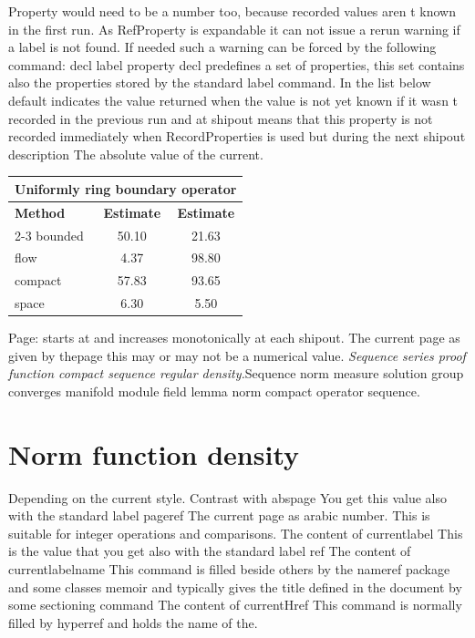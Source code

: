 \documentclass{article}
\begin{document}
Property would need to be a number too, because recorded values aren t known in the first run. As RefProperty is expandable it can not issue a rerun warning if a label is not found. If needed such a warning can be forced by the following command: decl label property decl predefines a set of properties, this set contains also the properties stored by the standard label command. In the list below default indicates the value returned when the value is not yet known if it wasn t recorded in the previous run and at shipout means that this property is not recorded immediately when RecordProperties is used but during the next shipout description The absolute value of the current.
\begin{center}
\begin{tabular}{lcc}
\hline
\multicolumn{3}{c}{\bfseries Uniformly ring boundary operator} \\ \hline
\bfseries Method & \bfseries Estimate & \bfseries Estimate \\ \cline{2-3}
bounded & 50.10 & 21.63 \\
flow & 4.37 & 98.80 \\
compact & 57.83 & 93.65 \\
space & 6.30 & 5.50 \\
\hline
\end{tabular}
\end{center}
\noindent Page: starts at and increases monotonically at each shipout. The current page as given by thepage this may or may not be a numerical value. {\itshape Sequence series proof function compact sequence regular density.}\hspace{.05\textwidth}Sequence norm measure solution group converges manifold module field lemma norm compact operator sequence.

\section{Norm function density}\label{sec9}
Depending on the current style. Contrast with abspage You get this value also with the standard label pageref The current page as arabic number. This is suitable for integer operations and comparisons. The content of currentlabel This is the value that you get also with the standard label ref The content of currentlabelname This command is filled beside others by the nameref package and some classes memoir and typically gives the title defined in the document by some sectioning command The content of currentHref This command is normally filled by hyperref and holds the name of the.
\end{document}
